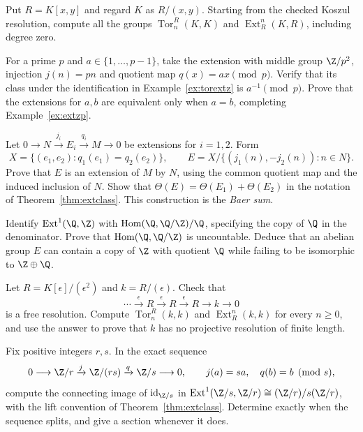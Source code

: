 \begin{exercise}[$\star\star$]\label{ex:koszul}
Put $R=K[x,y]$ and regard $K$ as $R/(x,y)$. Starting from the checked Koszul resolution, compute all the groups $\operatorname{Tor}_n^R(K,K)$ and $\operatorname{Ext}^n_R(K,R)$, including degree zero.
\end{exercise}

\begin{exercise}[$\star\star$]\label{ex:extzp2}
For a prime $p$ and $a\in\{1,\ldots,p-1\}$, take the extension with middle group $\Z/p^2$, injection $j(n)=pn$ and quotient map $q(x)=ax\pmod p$. Verify that its class under the identification in Example~\ref{ex:torextz} is $a^{-1}\pmod p$. Prove that the extensions for $a,b$ are equivalent only when $a=b$, completing Example~\ref{ex:extzp}.
\end{exercise}

\begin{exercise}[$\star\star$]\label{ex:baersum}
Let $0\to N\xrightarrow{j_i}E_i\xrightarrow{q_i}M\to0$ be extensions for $i=1,2$. Form
\[
X=\{(e_1,e_2):q_1(e_1)=q_2(e_2)\},\qquad
E=X/\{(j_1(n),-j_2(n)):n\in N\}.
\]
Prove that $E$ is an extension of $M$ by $N$, using the common quotient map and the induced inclusion of $N$. Show that
$\Theta(E)=\Theta(E_1)+\Theta(E_2)$ in the notation of Theorem~\ref{thm:extclass}. This construction is the \emph{Baer sum}.
\end{exercise}

\begin{exercise}[$\star\star\star$]\label{ex:extqz}
Identify
$\operatorname{Ext}^1(\Q,\Z)$ with
$\operatorname{Hom}(\Q,\Q/\Z)/\Q$, specifying the copy of $\Q$ in the denominator. Prove that $\operatorname{Hom}(\Q,\Q/\Z)$ is uncountable. Deduce that an abelian group $E$ can contain a copy of $\Z$ with quotient $\Q$ while failing to be isomorphic to $\Z\oplus\Q$.
\end{exercise}

\begin{exercise}[$\star\star$]\label{ex:v10new-ch07-dualnumbers}
Let $R=K[\epsilon]/(\epsilon^2)$ and $k=R/(\epsilon)$. Check that
\[
\cdots\xrightarrow{\epsilon}R\xrightarrow{\epsilon}R
\xrightarrow{\epsilon}R\longrightarrow k\longrightarrow0
\]
is a free resolution. Compute $\operatorname{Tor}_n^R(k,k)$ and
$\operatorname{Ext}^n_R(k,k)$ for every $n\ge0$, and use the answer to prove that $k$ has no projective resolution of finite length.
\end{exercise}

\begin{exercise}[$\star\star$]\label{ex:v10new-ch07-connecting}
Fix positive integers $r,s$. In the exact sequence
\[
0\longrightarrow\Z/r\xrightarrow{j}\Z/(rs)
\xrightarrow{q}\Z/s\longrightarrow0,
\qquad j(a)=sa,\quad q(b)=b\pmod s,
\]
compute the connecting image of $\mathrm{id}_{\Z/s}$ in
$\operatorname{Ext}^1(\Z/s,\Z/r)\cong(\Z/r)/s(\Z/r)$, with the lift convention of Theorem~\ref{thm:extclass}. Determine exactly when the sequence splits, and give a section whenever it does.
\end{exercise}

